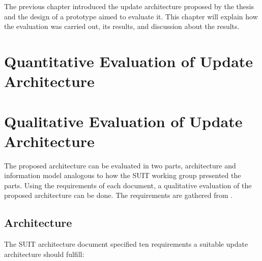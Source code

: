 \documentclass[0-thesis.tex]{subfiles}
\begin{document}
The previous chapter introduced the update architecture proposed by the thesis and the
design of a prototype aimed to evaluate it. This chapter will explain how the evaluation
was carried out, its results, and discussion about the results.

\section{Quantitative Evaluation of Update Architecture}
\label{sec:quant-evaluation}

\section{Qualitative Evaluation of Update Architecture}
\label{sec:qual-evaluation}
The proposed architecture can be evaluated in two parts, architecture and information
model analogous to how the SUIT working group presented the parts. Using the requirements
of each document, a qualitative evaluation of the proposed architecture can be done. The
requirements are gathered from \parencite{suit-architecture, suit-information-model}.
\subsection{Architecture}
\label{ssec:arch-evaluation}
The SUIT architecture document specified ten requirements a suitable update architecture
should fulfill:
\end{document}
